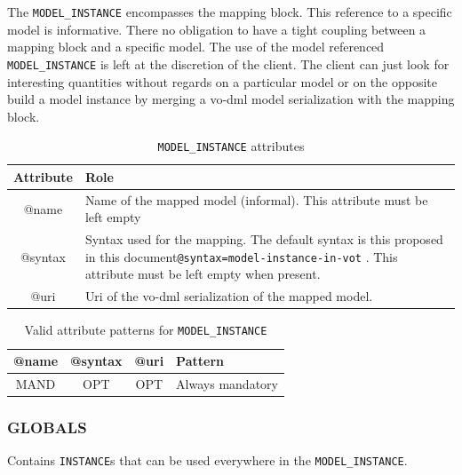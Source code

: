 \documentclass[11pt,a4paper]{ivoa}
\begin{document}
The  \texttt{MODEL\_INSTANCE}  encompasses the mapping block. 
This reference to a specific model is informative. There no obligation to have a tight coupling between a mapping block and a specific model. The use of the model referenced  \texttt{MODEL\_INSTANCE}  is left at the discretion of the client. The client can just look for interesting quantities without regards on a particular model or on the opposite build a model instance by merging a vo-dml model serialization with the mapping block.


\begin{table}[!htbp]
\small
\centering
\begin{tabulary}{\linewidth}{|c|J|}       
       \hline 
            \textbf{Attribute} & 
            \textbf {Role}\\
       \hline         \hline  
            @name  & 
            Name of the mapped model (informal).  This attribute must be left empty  \\
       \hline 
            @syntax  & 
            Syntax used for the mapping. The default syntax  is this proposed in this document\texttt{@syntax=model-instance-in-vot} . This attribute must be left empty when present.\\
       \hline 
            @uri  & 
            Uri of the vo-dml serialization of the mapped model. \\
       \hline 
     \end{tabulary}
     \caption{\texttt{MODEL\_INSTANCE} attributes} 
     \label{tbl:model-att}
 \end{table}

\begin{table}[!htbp]
\small
\centering
\begin{tabulary}{\linewidth}{|c|c|c|J|}
    \hline 
        \textbf{@name} &        
        \textbf{@syntax} &       
        \textbf{@uri} &
        \textbf{Pattern}\\
    \hline      \hline  
        MAND &           
        OPT &           
        OPT &   
        Always mandatory\\
   \hline 
\end{tabulary}
     \caption{Valid attribute patterns for  \texttt{MODEL\_INSTANCE}} 
     \label{tbl:model-pattern}
 \end{table}
\FloatBarrier

 \FloatBarrier

%
%

\subsubsection{GLOBALS}
 Contains  \texttt{INSTANCE}s  that can be used everywhere in the \texttt{MODEL\_INSTANCE}.
\end{document}
